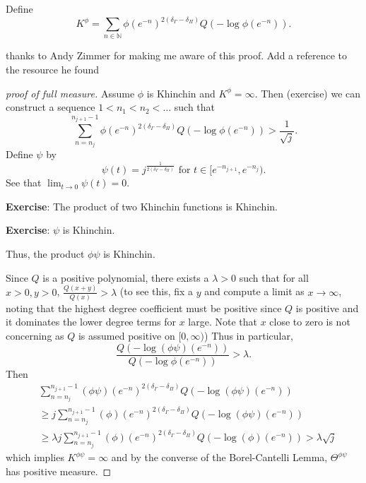 \documentclass[11pt]{amsart}
\theoremstyle{plain}
\theoremstyle{definition}
\theoremstyle{remark}
\begin{document}
Define 
\[
  K^\phi =
  \sum_{n\in\mathbb N} \phi(e^{-n})^{2(\delta_\Gamma-\delta_\Pi)}Q(-\log \phi
  (e^{-n})).
\]

{\color{red} thanks to Andy Zimmer for making me aware of this proof. Add a
reference to the resource he found}
 
\begin{proof}[proof of full measure]
  Assume $\phi$ is Khinchin and $K^\phi=\infty$. 
  Then (exercise) we can construct a sequence $1<n_1<n_2<\ldots$ such that 
  \[
    \sum_{n=n_j}^{n_{j+1}-1} 
    \phi(e^{-n})^{2(\delta_\Gamma-\delta_\Pi)}Q(-\log \phi
    (e^{-n})) > \frac1{\sqrt{j}}.
  \]
  Define $\psi$ by 
  \[
    \psi(t)=j^{\frac1{2(\delta_\Gamma-\delta_\Pi)}} \textrm{ for
    }t\in[e^{-n_{j+1}},e^{-n_j}).
  \]
  See that $\lim_{t\to0}\psi(t)=0$.

  {\bf Exercise}: The product of two Khinchin functions is Khinchin.

  {\bf Exercise}: $\psi$ is Khinchin. 

  Thus, the product $\phi\psi$ is Khinchin.

  Since $Q$ is a positive polynomial, there exists a $\lambda>0$ such that
  for all $x>0, y>0$, $\frac{Q(x+y)}{Q(x)}>\lambda$ (to see this, fix a
  $y$ and compute a limit as $x\to\infty$, noting that the highest degree
  coefficient must be positive since $Q$ is positive and it dominates the
  lower degree terms for $x$ large. 
  Note that $x$ close to zero is not concerning as $Q$ is assumed positive
  on $[0,\infty)$)
  Thus in particular, 
  \[
    \frac{Q(-\log(\phi\psi)(e^{-n}))}{Q(-\log\phi(e^{-n}))}>\lambda.
  \]
  Then 
  \begin{align*}
    & \sum_{n=n_j}^{n_{j+1}-1} 
    (\phi\psi)(e^{-n})^{2(\delta_\Gamma-\delta_\Pi)}Q(-\log (\phi\psi)
    (e^{-n})) \\
    & \geq 
    j \sum_{n=n_j}^{n_{j+1}-1} 
    (\phi)(e^{-n})^{2(\delta_\Gamma-\delta_\Pi)}Q(-\log (\phi\psi)
    (e^{-n})) \\
    & \geq 
    \lambda j \sum_{n=n_j}^{n_{j+1}-1} 
    (\phi)(e^{-n})^{2(\delta_\Gamma-\delta_\Pi)}Q(-\log (\phi)
    (e^{-n})) 
    >\lambda \sqrt j
  \end{align*}
  which implies $K^{\phi\psi}=\infty$ and 
  by the converse of the
  Borel-Cantelli Lemma, 
  $\Theta^{\phi\psi}$ has positive measure.



\end{proof}
\end{document}
